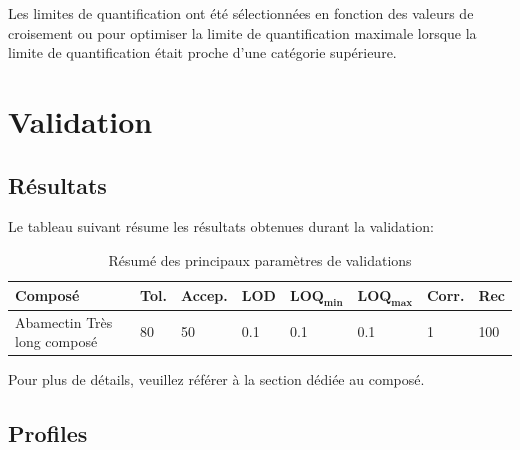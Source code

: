 \documentclass[letterpaper]{article}
\begin{document}
Les limites de quantification ont été sélectionnées en fonction des valeurs de croisement ou pour optimiser la limite de quantification maximale lorsque la limite de quantification était proche d’une catégorie supérieure.
\section{Validation}
\subsection{Résultats}
Le tableau suivant résume les résultats obtenues durant la validation:\\
\begin{table}[h!]
    \centering
    \begin{tabular}{m{7em}|m{4em}|m{4em}|m{4em}|m{4em}|m{4em}|m{4em}|m{4em}}
        \textbf{Composé} & \textbf{Tol.} & \textbf{Accep.} & \textbf{LOD} & \(\mathbf{LOQ_{min}}\) & \(\mathbf{LOQ_{max}}\) & \textbf{Corr.} & \textbf{Rec} \\
        \hline
        Abamectin Très long composé & 80 & 50 & 0.1 & 0.1 & 0.1 & 1 & 100
    \end{tabular}
    \caption{Résumé des principaux paramètres de validations}
    \label{tab:2}
\end{table}
\FloatBarrier
Pour plus de détails, veuillez référer à la section dédiée au composé.
\newpage
\subsection{Profiles}



\newpage


\end{document}
